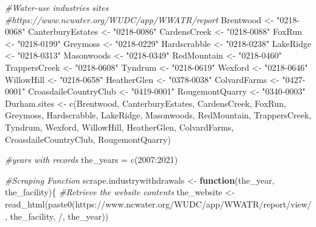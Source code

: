 \documentclass[
  12pt,
]{article}
\newenvironment{Shaded}{\begin{snugshade}}{\end{snugshade}}
\newcommand{\CommentTok}[1]{\textcolor[rgb]{0.56,0.35,0.01}{\textit{#1}}}
\newcommand{\ControlFlowTok}[1]{\textcolor[rgb]{0.13,0.29,0.53}{\textbf{#1}}}
\newcommand{\DecValTok}[1]{\textcolor[rgb]{0.00,0.00,0.81}{#1}}
\newcommand{\FunctionTok}[1]{\textcolor[rgb]{0.00,0.00,0.00}{#1}}
\newcommand{\NormalTok}[1]{#1}
\newcommand{\OtherTok}[1]{\textcolor[rgb]{0.56,0.35,0.01}{#1}}
\newcommand{\SpecialCharTok}[1]{\textcolor[rgb]{0.00,0.00,0.00}{#1}}
\newcommand{\StringTok}[1]{\textcolor[rgb]{0.31,0.60,0.02}{#1}}
\begin{document}
\begin{Shaded}
\begin{Highlighting}[]
\CommentTok{\#Water{-}use industries\textquotesingle{} sites }
\CommentTok{\#https://www.ncwater.org/WUDC/app/WWATR/report}
\NormalTok{Brentwood }\OtherTok{\textless{}{-}} \StringTok{"0218{-}0068"}
\NormalTok{CanterburyEstates }\OtherTok{\textless{}{-}} \StringTok{"0218{-}0086"}
\NormalTok{CardensCreek }\OtherTok{\textless{}{-}} \StringTok{"0218{-}0088"}
\NormalTok{FoxRun }\OtherTok{\textless{}{-}} \StringTok{"0218{-}0199"}
\NormalTok{Greymoss }\OtherTok{\textless{}{-}} \StringTok{"0218{-}0229"}
\NormalTok{Hardscrabble }\OtherTok{\textless{}{-}} \StringTok{"0218{-}0238"}
\NormalTok{LakeRidge }\OtherTok{\textless{}{-}} \StringTok{"0218{-}0313"}
\NormalTok{Masonwoods }\OtherTok{\textless{}{-}} \StringTok{"0218{-}0349"}
\NormalTok{RedMountain }\OtherTok{\textless{}{-}} \StringTok{"0218{-}0460"}
\NormalTok{TrappersCreek }\OtherTok{\textless{}{-}} \StringTok{"0218{-}0608"}
\NormalTok{Tyndrum }\OtherTok{\textless{}{-}} \StringTok{"0218{-}0619"}
\NormalTok{Wexford }\OtherTok{\textless{}{-}} \StringTok{"0218{-}0646"}
\NormalTok{WillowHill }\OtherTok{\textless{}{-}} \StringTok{"0218{-}0658"}
\NormalTok{HeatherGlen }\OtherTok{\textless{}{-}} \StringTok{"0378{-}0038"}
\NormalTok{ColvardFarms }\OtherTok{\textless{}{-}} \StringTok{"0427{-}0001"}
\NormalTok{CroasdaileCountryClub }\OtherTok{\textless{}{-}} \StringTok{"0419{-}0001"}
\NormalTok{RougemontQuarry }\OtherTok{\textless{}{-}} \StringTok{"0340{-}0003"}
\NormalTok{Durham.sites }\OtherTok{\textless{}{-}} \FunctionTok{c}\NormalTok{(Brentwood, CanterburyEstates, CardensCreek, FoxRun, Greymoss, Hardscrabble, LakeRidge, Masonwoods, RedMountain, TrappersCreek, Tyndrum, Wexford, WillowHill, HeatherGlen, ColvardFarms, CroasdaileCountryClub, RougemontQuarry)}

\CommentTok{\#years with records}
\NormalTok{the\_years }\OtherTok{=} \FunctionTok{c}\NormalTok{(}\DecValTok{2007}\SpecialCharTok{:}\DecValTok{2021}\NormalTok{)}

\CommentTok{\#Scraping Function}
\NormalTok{scrape.industrywithdrawals }\OtherTok{\textless{}{-}} \ControlFlowTok{function}\NormalTok{(the\_year, the\_facility)\{}
  \CommentTok{\#Retrieve the website contents }
\NormalTok{  the\_website }\OtherTok{\textless{}{-}} \FunctionTok{read\_html}\NormalTok{(}\FunctionTok{paste0}\NormalTok{(}\StringTok{\textquotesingle{}https://www.ncwater.org/WUDC/app/WWATR/report/view/\textquotesingle{}}\NormalTok{, }
\NormalTok{                                  the\_facility, }\StringTok{\textquotesingle{}/\textquotesingle{}}\NormalTok{, the\_year))}
  

\end{Highlighting}
\end{Shaded}
\end{document}
